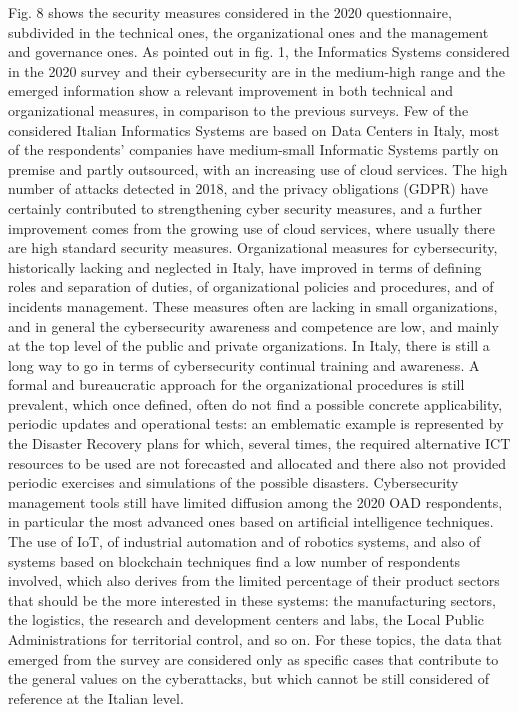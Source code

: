 \documentclass{easychair}
\begin{document}

Fig. 8 shows the security measures considered in the 2020 questionnaire, subdivided in the technical ones, the organizational ones and  the management and governance ones. 
As pointed out in fig. 1, the Informatics Systems considered in the 2020 survey and their cybersecurity  are in the medium-high range and the emerged information  show a relevant 
improvement in both technical and organizational measures, in comparison to the previous surveys. Few of the considered Italian Informatics Systems are based on Data Centers in 
Italy, most of the respondents’ companies have medium-small Informatic Systems partly on premise and partly outsourced, with an increasing use of cloud services.
The high number of attacks detected in 2018, and the privacy obligations (GDPR) have certainly contributed to strengthening cyber security measures, and a further improvement 
comes from the growing use of cloud services, where usually there are high standard security measures. Organizational measures for cybersecurity, historically lacking and neglected
in Italy, have improved in terms of defining roles and separation of duties, of organizational policies and procedures, and of incidents management. These measures often are lacking
in small organizations, and in general the cybersecurity awareness and competence are low, and mainly at the top level of the public and private organizations. In Italy, there is 
still a long way to go in terms of cybersecurity continual training and awareness. A formal and bureaucratic approach for the organizational procedures is still prevalent, which 
once defined, often do not find a possible concrete applicability, periodic updates and operational tests: an emblematic example is represented by the Disaster Recovery plans for 
which, several times, the required alternative ICT resources to be used are not forecasted and allocated and there also not provided periodic exercises and simulations of the 
possible disasters. Cybersecurity management tools still have limited diffusion among the 2020 OAD respondents, in particular the most advanced ones based on artificial intelligence
techniques. The use of IoT, of industrial automation and of robotics systems, and also of systems based on blockchain techniques find a low number of respondents involved, which 
also derives from the limited percentage of their product sectors that should be the more interested in these systems: the manufacturing sectors, the logistics, the research and 
development centers and labs, the Local Public Administrations for territorial control, and so on. For these topics, the data that emerged from the survey are considered only as 
specific cases that contribute to the general values on the cyberattacks, but which cannot be still considered of reference at the Italian level.
\end{document}

